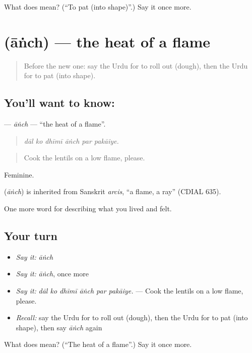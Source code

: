 \begin{tcolorbox}[breakable,colback=teal!4,colframe=teal!35!black,title={Before you move on}]
What does  mean? (\textquotedblleft{}To pat (into shape)\textquotedblright{}.) Say it once more.
\end{tcolorbox}
\section[\texorpdfstring{\ur{آنچ} (āṅch)}{آنچ (āṅch)}]{ (āṅch) — the heat of a flame}

\label{lesson:UR-C507-anch}



\begin{quote}
Before the new one: say the Urdu for to roll out (dough), then the Urdu for to pat (into shape).
\end{quote}

\subsection*{You'll want to know: }
\textbf{} — \emph{āṅch} — \textquotedblleft{}the heat of a flame\textquotedblright{}.

\begin{quote}
     
\end{quote}

\begin{quote}
\emph{dāl ko dhīmī āṅch par pakāiye.}
\end{quote}

\begin{quote}
Cook the lentils on a low flame, please.
\end{quote}

Feminine.

\begin{cousinweb}
\textbf{} (\emph{āṅch}) is inherited from Sanskrit \emph{arcis}, \textquotedblleft{}a flame, a ray\textquotedblright{} (CDIAL 635).
\end{cousinweb}

\begin{grammarlens}[title={What you've built}]
One more word for describing what you lived and felt.
\end{grammarlens}

\subsection*{Your turn}
\begin{itemize}
\raggedright
  \item \emph{Say it:} \emph{āṅch}
  \item \emph{Say it:} \emph{āṅch}, once more
  \item \emph{Say it:} \emph{dāl ko dhīmī āṅch par pakāiye.} — Cook the lentils on a low flame, please.
  \item \emph{Recall:} say the Urdu for to roll out (dough), then the Urdu for to pat (into shape), then say \emph{āṅch} again
\end{itemize}

\begin{tcolorbox}[breakable,colback=teal!4,colframe=teal!35!black,title={Before you move on}]
What does  mean? (\textquotedblleft{}The heat of a flame\textquotedblright{}.) Say it once more.
\end{tcolorbox}
